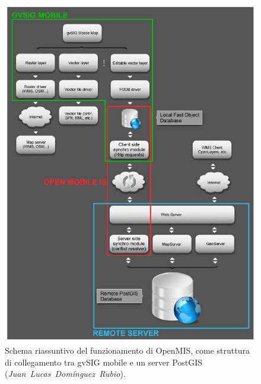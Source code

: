 \documentclass{paper}
\begin{document}
	\begin{center}
	  \begin{figure}
	    \begin{center}
	      \includegraphics[scale=0.5]{img/generalscheme.png}
	    \end{center}
	    \caption{{\small Schema riassuntivo del funzionamento
			di OpenMIS, come struttura di collegamento tra gvSIG mobile e un server
			PostGIS (\emph{Juan~Lucas~Dom\'{i}nguez~Rubio}).}}
	    \label{fig:Schema-riassuntivo}
	  \end{figure}
	\end{center}
\end{document}
